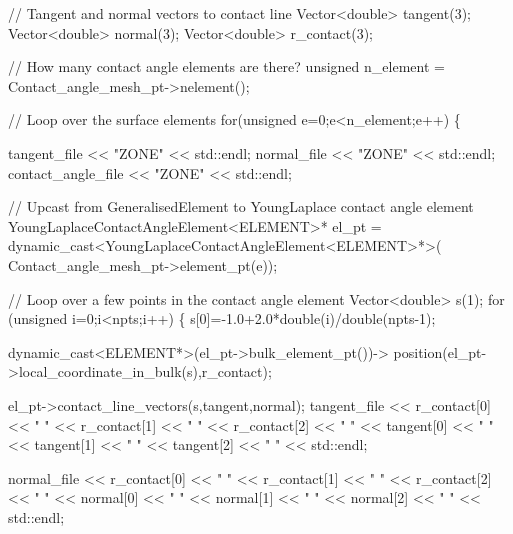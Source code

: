 \begin{DoxyCodeInclude}
{{{{ \textcolor{comment}{// Tangent and normal vectors to contact line}
 Vector<double> tangent(3);
 Vector<double> normal(3);
 Vector<double> r\_contact(3);
 
 \textcolor{comment}{// How many contact angle elements are there?}
 \textcolor{keywordtype}{unsigned} n\_element = Contact\_angle\_mesh\_pt->nelement();
 
 \textcolor{comment}{// Loop over the surface elements}
 \textcolor{keywordflow}{for}(\textcolor{keywordtype}{unsigned} e=0;e<n\_element;e++)
  \{
   
   tangent\_file << \textcolor{stringliteral}{"ZONE"} << std::endl;
   normal\_file << \textcolor{stringliteral}{"ZONE"} << std::endl;
   contact\_angle\_file << \textcolor{stringliteral}{"ZONE"} << std::endl;
   
   \textcolor{comment}{// Upcast from GeneralisedElement to YoungLaplace contact angle element}
   YoungLaplaceContactAngleElement<ELEMENT>* el\_pt = 
    \textcolor{keyword}{dynamic\_cast<}YoungLaplaceContactAngleElement<ELEMENT>*\textcolor{keyword}{>}(
     Contact\_angle\_mesh\_pt->element\_pt(e));
   
   \textcolor{comment}{// Loop over a few points in the contact angle element}
   Vector<double> s(1);
   \textcolor{keywordflow}{for} (\textcolor{keywordtype}{unsigned} i=0;i<npts;i++)
    \{
     s[0]=-1.0+2.0*double(i)/double(npts-1);
     
     \textcolor{keyword}{dynamic\_cast<}ELEMENT*\textcolor{keyword}{>}(el\_pt->bulk\_element\_pt())->
      position(el\_pt->local\_coordinate\_in\_bulk(s),r\_contact);
     
     el\_pt->contact\_line\_vectors(s,tangent,normal);
     tangent\_file << r\_contact[0] << \textcolor{stringliteral}{" "} 
                  << r\_contact[1] << \textcolor{stringliteral}{" "} 
                  << r\_contact[2] << \textcolor{stringliteral}{" "} 
                  << tangent[0] << \textcolor{stringliteral}{" "} 
                  << tangent[1] << \textcolor{stringliteral}{" "} 
                  << tangent[2] << \textcolor{stringliteral}{" "}  << std::endl;
     
     normal\_file << r\_contact[0] << \textcolor{stringliteral}{" "} 
                 << r\_contact[1] << \textcolor{stringliteral}{" "} 
                 << r\_contact[2] << \textcolor{stringliteral}{" "} 
                 << normal[0] << \textcolor{stringliteral}{" "} 
                 << normal[1] << \textcolor{stringliteral}{" "} 
                 << normal[2] << \textcolor{stringliteral}{" "}  << std::endl;
     
}}}}
\end{DoxyCodeInclude}
